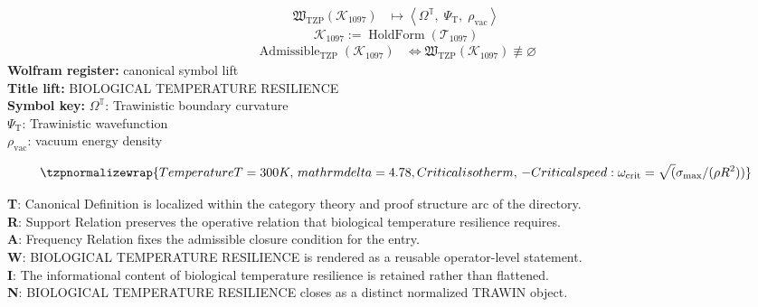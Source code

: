 \noindent
\begin{minipage}[t]{0.48\linewidth}
\begingroup
\small
\[
\begin{aligned}
\mathfrak{W}_{\mathrm{TZP}}\!\left(\mathcal{K}_{1097}\right)
&\longmapsto
\left\langle \Omega^{\mathbb{T}},\; \Psi_{\mathrm{T}},\; \rho_{\mathrm{vac}} \right\rangle
\end{aligned}
\]
\[
\mathcal{K}_{1097}
:=
\operatorname{HoldForm}\!\left(\mathcal{T}_{1097}\right)
\]
\[
\begin{aligned}
\operatorname{Admissible}_{\mathrm{TZP}}\!\left(\mathcal{K}_{1097}\right)
&\Longleftrightarrow
\mathfrak{W}_{\mathrm{TZP}}\!\left(\mathcal{K}_{1097}\right)\not\equiv\varnothing
\end{aligned}
\]
\textbf{Wolfram register:} canonical symbol lift\\
\textbf{Title lift:} BIOLOGICAL TEMPERATURE RESILIENCE\\
\textbf{Symbol key:} \(\Omega^{\mathbb{T}}\): Trawinistic boundary curvature\\ \(\Psi_{\mathrm{T}}\): Trawinistic wavefunction\\ \(\rho_{\mathrm{vac}}\): vacuum energy density
\par
\endgroup
\end{minipage}\hfill
\begin{minipage}[t]{0.48\linewidth}
\[
\tzpnormalizewrap{Temperature T = 300K,\,mathrm{delta} = 4.78, Critical isotherm,\,- Critical speed: \omega_{\mathrm{crit}} = \sqrt(\sigma_{\mathrm{max}}/(\rho R^{2}))}
\]

\small
\textbf{T}: Canonical Definition is localized within the category theory and proof structure arc of the directory.\\
\textbf{R}: Support Relation preserves the operative relation that biological temperature resilience requires.\\
\textbf{A}: Frequency Relation fixes the admissible closure condition for the entry.\\
\textbf{W}: BIOLOGICAL TEMPERATURE RESILIENCE is rendered as a reusable operator-level statement.\\
\textbf{I}: The informational content of biological temperature resilience is retained rather than flattened.\\
\textbf{N}: BIOLOGICAL TEMPERATURE RESILIENCE closes as a distinct normalized TRAWIN object.
\normalsize
\end{minipage}

